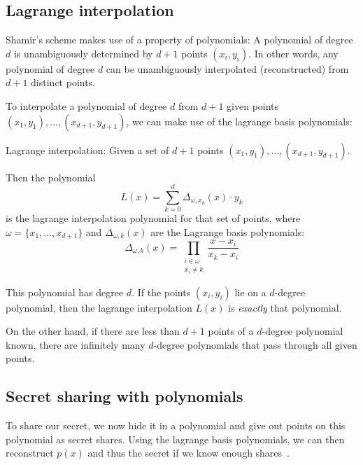 \subsection{Lagrange interpolation}
Shamir's scheme makes use of a property of polynomials: A polynomial of degree $d$ is unambiguously determined by $d+1$ points $(x_i, y_i)$.
In other words, any polynomial of degree $d$ can be unambiguously interpolated (reconstructed) from $d+1$ distinct points.

To interpolate a polynomial of degree $d$ from $d+1$ given points $(x_1, y_1), \dots, (x_{d+1}, y_{d+1})$, we can make use of the lagrange basis polynomials:~\cite{yao_lightweight_2015}

\begin{definition}
    Lagrange interpolation: Given a set of $d+1$ points $(x_1, y_1), \dots, (x_{d+1}, y_{d+1})$.

    Then the polynomial 
    \begin{equation}
        L(x) = \sum_{k=0}^d \Delta_{\omega, x_k}(x) \cdot y_k
    \end{equation}
    is the lagrange interpolation polynomial for that set of points, where $\omega = \{x_1, \dots, x_{d+1}\}$ and $\Delta_{\omega,k}(x)$ are the Lagrange basis polynomials:
    \begin{equation}
        \Delta_{\omega,k}(x) = \prod_{\substack{i\in\omega\\ x_i \neq k}} \frac{x-x_i}{x_k-x_i}
    \end{equation}
\end{definition}

This polynomial has degree $d$. If the points $(x_i, y_i)$ lie on a $d$-degree polynomial, then the lagrange interpolation $L(x)$ is \emph{exactly} that polynomial.

On the other hand, if there are less than $d+1$ points of a $d$-degree polynomial known, there are infinitely many $d$-degree polynomials that pass through all given points.~\cite{shamir_how_1979}


\subsection{Secret sharing with polynomials}
To share our secret, we now hide it in a polynomial and give out points on this polynomial as secret shares.
Using the lagrange basis polynomials, we can then reconstruct $p(x)$ and thus the secret if we know enough shares~\cite{shamir_how_1979}.

